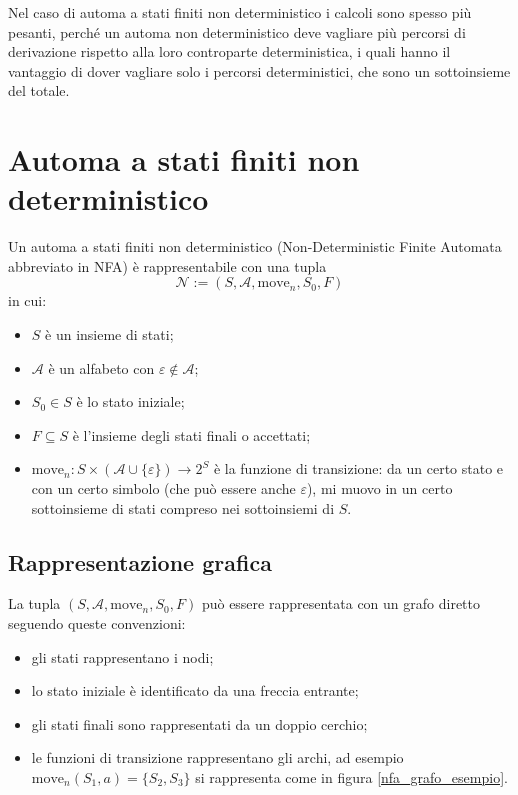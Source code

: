 \documentclass[class=book, crop=false, oneside, 12pt]{standalone}
\begin{document}
Nel caso di automa a stati finiti non deterministico i calcoli sono spesso più pesanti, perché un automa non deterministico deve vagliare più percorsi di derivazione rispetto alla loro controparte deterministica, i quali hanno il vantaggio di dover vagliare solo i percorsi deterministici, che sono un sottoinsieme del totale.

\section{Automa a stati finiti non deterministico}
Un automa a stati finiti non deterministico (Non-Deterministic Finite Automata abbreviato in NFA) è rappresentabile con una tupla
\begin{equation}
    \mathcal{N} := (S, \mathcal{A}, \textrm{move}_n, S_0, F)
    \label{nfa_tupla}
\end{equation}
in cui:
\begin{itemize}
    \item \(S\) è un insieme di stati;
    \item \(\mathcal{A}\) è un alfabeto con \(\varepsilon \notin \mathcal{A}\);
    \item \(S_0 \in S\) è lo stato iniziale;
    \item \(F \subseteq S\) è l’insieme degli stati finali o accettati;
    \item \(\textrm{move}_n : S \times (\mathcal{A} \cup \{\varepsilon\}) \to 2^S\) è la funzione di transizione: da un certo stato e con un certo simbolo (che può essere anche \(\varepsilon\)), mi muovo in un certo sottoinsieme di stati compreso nei sottoinsiemi di \(S\).
\end{itemize}

\subsection{Rappresentazione grafica}
La tupla \((S, \mathcal{A}, \textrm{move}_n, S_0, F)\) può essere rappresentata con un grafo diretto seguendo queste convenzioni:
\begin{itemize}
    \item gli stati rappresentano i nodi;
    \item lo stato iniziale è identificato da una freccia entrante;
    \item gli stati finali sono rappresentati da un doppio cerchio;
    \item le funzioni di transizione rappresentano gli archi, ad esempio \(\textrm{move}_n(S_1, a) = \{S_2, S_3\}\) si rappresenta come in figura \ref{nfa_grafo_esempio}.
\end{itemize}
\end{document}
